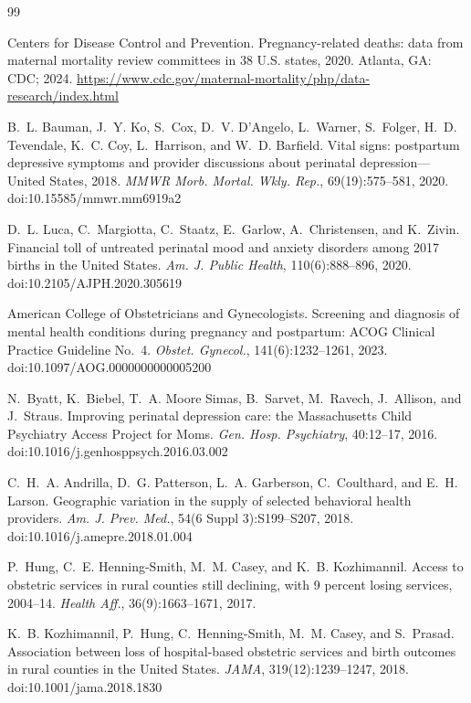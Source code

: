 \documentclass[10pt,twocolumn,letterpaper]{article}
\begin{document}
\begin{thebibliography}{99}

 Centers for Disease Control and Prevention. Pregnancy-related deaths: data from maternal mortality review committees in 38 U.S. states, 2020. Atlanta, GA: CDC; 2024. \url{https://www.cdc.gov/maternal-mortality/php/data-research/index.html}

 B.~L. Bauman, J.~Y. Ko, S.~Cox, D.~V. D'Angelo, L.~Warner, S.~Folger, H.~D. Tevendale, K.~C. Coy, L.~Harrison, and W.~D. Barfield. Vital signs: postpartum depressive symptoms and provider discussions about perinatal depression---United States, 2018. \emph{MMWR Morb. Mortal. Wkly. Rep.}, 69(19):575--581, 2020. doi:10.15585/mmwr.mm6919a2

 D.~L. Luca, C.~Margiotta, C.~Staatz, E.~Garlow, A.~Christensen, and K.~Zivin. Financial toll of untreated perinatal mood and anxiety disorders among 2017 births in the United States. \emph{Am. J. Public Health}, 110(6):888--896, 2020. doi:10.2105/AJPH.2020.305619

 American College of Obstetricians and Gynecologists. Screening and diagnosis of mental health conditions during pregnancy and postpartum: ACOG Clinical Practice Guideline No.~4. \emph{Obstet. Gynecol.}, 141(6):1232--1261, 2023. doi:10.1097/AOG.0000000000005200

 N.~Byatt, K.~Biebel, T.~A. Moore Simas, B.~Sarvet, M.~Ravech, J.~Allison, and J.~Straus. Improving perinatal depression care: the Massachusetts Child Psychiatry Access Project for Moms. \emph{Gen. Hosp. Psychiatry}, 40:12--17, 2016. doi:10.1016/j.genhosppsych.2016.03.002

 C.~H.~A. Andrilla, D.~G. Patterson, L.~A. Garberson, C.~Coulthard, and E.~H. Larson. Geographic variation in the supply of selected behavioral health providers. \emph{Am. J. Prev. Med.}, 54(6 Suppl 3):S199--S207, 2018. doi:10.1016/j.amepre.2018.01.004

 P.~Hung, C.~E. Henning-Smith, M.~M. Casey, and K.~B. Kozhimannil. Access to obstetric services in rural counties still declining, with 9 percent losing services, 2004--14. \emph{Health Aff.}, 36(9):1663--1671, 2017.

 K.~B. Kozhimannil, P.~Hung, C.~Henning-Smith, M.~M. Casey, and S.~Prasad. Association between loss of hospital-based obstetric services and birth outcomes in rural counties in the United States. \emph{JAMA}, 319(12):1239--1247, 2018. doi:10.1001/jama.2018.1830


\end{thebibliography}
\end{document}
